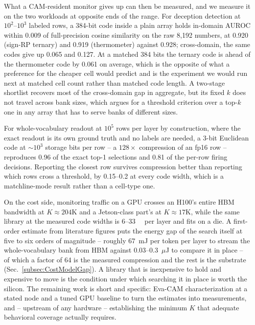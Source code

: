\documentclass[conference]{IEEEtran}
\newcommand{\cam}{{CAM}\xspace}
\newcommand{\auroc}{{AUROC}\xspace}
\newcommand{\signrp}{{sign-RP}\xspace}
\begin{document}
What a \cam-resident monitor gives up can then be measured, and we
measure it on the two workloads at opposite ends of the range. For
deception detection at $10^{2}$--$10^{3}$ labeled rows, a 384-bit code
inside a plain array holds in-domain \auroc within 0.009 of
full-precision cosine similarity on the raw 8{,}192 numbers, at 0.920
(\signrp ternary) and 0.919 (thermometer) against 0.928; cross-domain,
the same codes give up 0.065 and 0.127. At a matched 384 bits the
ternary code is ahead of the thermometer code by 0.061 on average, which
is the opposite of what a preference for the cheaper cell would predict
and is the experiment we would run next at matched cell count rather
than matched code length. A two-stage shortlist recovers most of the
cross-domain gap in aggregate, but its fixed $k$ does not travel across
bank sizes, which argues for a threshold criterion over a top-$k$ one in
any array that has to serve banks of different sizes.

For whole-vocabulary readout at $10^{5}$ rows per layer by construction,
where the exact readout is its own ground truth and no labels are needed,
a 3-bit Euclidean code at $\sim$$10^{3}$ storage bits per row -- a
$128\times$ compression of an fp16 row -- reproduces 0.96 of the exact
top-1 selections and 0.81 of the per-row firing decisions. Reporting the
closest row survives compression better than reporting which rows cross a
threshold, by 0.15--0.2 at every code width, which is a matchline-mode
result rather than a cell-type one.

On the cost side, monitoring traffic on a GPU crosses an H100's entire
HBM bandwidth at $K\!\approx\!204$K and a Jetson-class part's at
$K\!\approx\!17$K, while the same library at the measured code widths is
6--\qty{33}{\mega\byte} per layer and fits on a die. A first-order
estimate from literature figures puts the energy gap of the search
itself at five to six orders of magnitude -- roughly 67~mJ per token
per layer to stream the whole-vocabulary bank from HBM against
0.03--0.3~$\mu$J to compare it in place -- of which a factor of 64 is
the measured compression and the rest is the substrate
(Sec.~\ref{subsec:CostModelGap}). A library that is inexpensive to
hold and expensive to move is the condition under which searching it
in place is worth the silicon. The remaining work is short and
specific: Eva-CAM characterization at a stated node and a tuned GPU
baseline to turn the estimates into measurements, and -- upstream of
any hardware
-- establishing the minimum $K$ that adequate behavioral coverage
actually requires.
\end{document}
